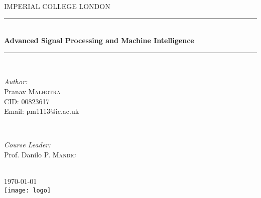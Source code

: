 \begin{titlepage}
\newcommand{\HRule}{\rule{\linewidth}{0.5mm}} 

\center

\textsc{\LARGE IMPERIAL COLLEGE LONDON}\\[1cm] 

\HRule \\[0.4cm]
{ \large \bfseries Advanced Signal Processing and Machine Intelligence}\\[0.4cm]

\HRule \\[1.5cm]

\begin{minipage}{0.4\textwidth}
\begin{flushleft} \large
\emph{Author:}\\
Pranav \textsc{Malhotra}
\\CID: 00823617
\\Email: pm1113@ic.ac.uk
\end{flushleft}
\end{minipage}
~
\begin{minipage}{0.4\textwidth}
\begin{flushright} \large
\emph{Course Leader:} \\
Prof. Danilo P. \textsc{Mandic} ~\\
\end{flushright}
\end{minipage}\\[2cm]

{\large \today}\\[2cm]

\texttt{[image: logo]} 

\vfill
\end{titlepage}